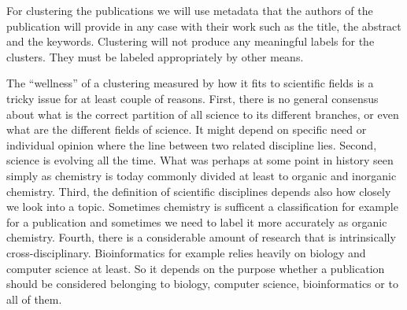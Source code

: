 For clustering the publications we will use metadata that the authors 
of the publication will provide in any case with their work such 
as the title, the abstract and the keywords. 
Clustering will not produce any meaningful labels for the 
clusters. They must be labeled appropriately by other means. 

The ``wellness'' of a clustering measured by how it fits to 
scientific fields is a tricky issue for at least couple of 
reasons.
First, there is no general consensus about what is the correct 
partition of all science to its different branches, or even what
are the different fields of science. It might depend 
on specific need or individual opinion where the line between two 
related discipline lies.
Second, science is evolving all the time. What was perhaps at some 
point in history seen simply as chemistry is today commonly 
divided at least to organic and inorganic chemistry.
Third, the definition of scientific disciplines depends also how 
closely we look into a topic. Sometimes chemistry is sufficent a
classification for example for a publication and sometimes we need 
to label it more accurately as organic chemistry.
Fourth, there is a considerable amount of research that is 
intrinsically cross-disciplinary. Bioinformatics for example relies
heavily on biology and computer science at least. So it depends on the 
purpose whether a publication should be considered belonging to
biology, computer science, bioinformatics or to all of them.




